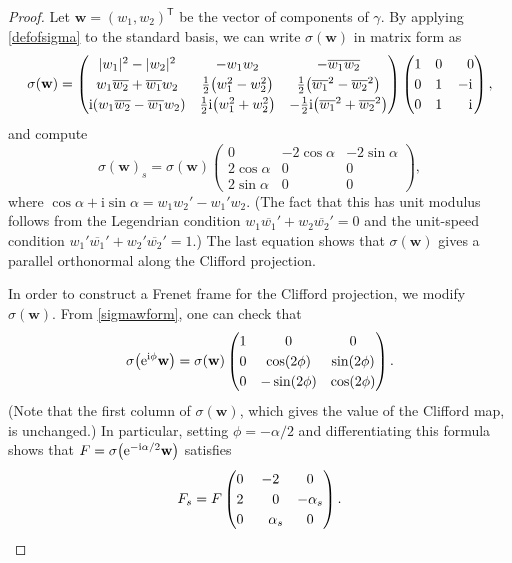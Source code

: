 \documentclass[pdftex]{sigma}
\def\ri{\mathrm{i}}
\def\gam{\gamma} %
\newcommand\bw{\mathbf w}
\numberwithin{equation}{section}
\begin{document}
\begin{proof} Let $\bw=(w_1, w_2)^{\mathsf{T}}$ be the vector of components of $\gam$. By applying \eqref{defofsigma} to the standard basis, we can write $\sigma(\bw)$ in matrix form as \begin{equation}\label{sigmawform}\renewcommand{\arraystretch}{1.2}
\sigma(\bw) = \begin{pmatrix} |w_1|^2 - |w_2|^2 & -w_1 w_2 & -\overline{w_1} \overline{w_2} \\
w_1\overline{w_2} + \overline{w_1} w_2 & \tfrac12\bigl(w_1^2-w_2^2\bigr) & \tfrac12\bigl(\overline{w_1}^2-\overline{w_2}^2\bigr) \\
\ri (w_1\overline{w_2} - \overline{w_1} w_2) & \tfrac12\ri \bigl(w_1^2+w_2^2\bigr) & -\tfrac12 \ri \bigl(\overline{w_1}^2 + \overline{w_2}^2\bigr)
\end{pmatrix} \begin{pmatrix} 1 & 0 & \hphantom{-}0 \\ 0 & 1 & -\ri \\ 0 & 1 & \hphantom{-}\ri \end{pmatrix},
\end{equation}
and compute
\[
\sigma(\bw)_s = \sigma(\bw) \begin{pmatrix} 0 & -2\cos \alpha & -2\sin\alpha \\ 2\cos\alpha & 0 & 0\\ 2\sin\alpha & 0 & 0\end{pmatrix},
\]
where $\cos \alpha + \ri \sin \alpha = w_1 w_2' - w_1' w_2$. (The fact that this has unit modulus follows from the Legendrian condition $w_1\overline{w_1}'+w_2 \overline{w_2}'=0$ and the unit-speed condition $w_1'\overline{w_1}'+w_2' \overline{w_2}'=1$.)
The last equation shows that $\sigma(\mathbf w)$ gives a parallel orthonormal along the Clifford projection.

In order to construct a Frenet frame for the Clifford projection, we modify $\sigma(\bw)$. From \eqref{sigmawform}, one can check that
\begin{equation*}%
\sigma\bigl({\rm e}^{\ri \phi} \bw\bigr) = \sigma(\bw) \begin{pmatrix} 1 & 0 & 0 \\ 0 & \cos(2\phi) & \sin(2\phi) \\ 0 & -\sin(2\phi) & \cos(2\phi) \end{pmatrix}.
\end{equation*}
(Note that the first column of $\sigma(\bw)$, which gives the value of the Clifford map, is unchanged.)
In particular, setting $\phi = -\alpha/2$ and differentiating this formula shows that $F= \sigma\bigl({\rm e}^{-\ri \alpha/2} \bw\bigr)$ satisfies
\[F_s = F \begin{pmatrix} 0 & -2 & 0 \\ 2 & \hphantom{-}0 & -\alpha_s \\ 0 & \hphantom{-}\alpha_s & 0 \end{pmatrix}.\]


\end{proof}
\end{document}

